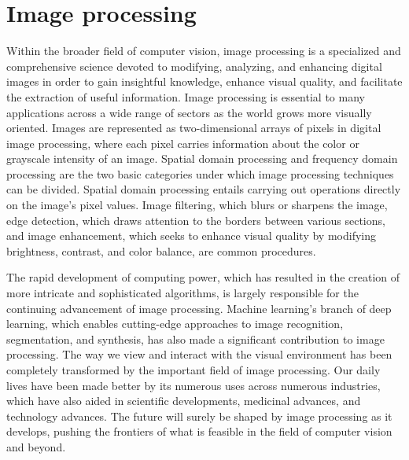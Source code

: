 \documentclass[a4paper,12pt]{report}%
\renewcommand{\\}{\vspace*{0.5\baselineskip} \newline}
\begin{document}
\section{Image processing}
Within the broader field of computer vision, image processing is a specialized and comprehensive science devoted to modifying, analyzing, and enhancing digital images in order to gain insightful knowledge, enhance visual quality, and facilitate the extraction of useful information. Image processing is essential to many applications across a wide range of sectors as the world grows more visually oriented.
Images are represented as two-dimensional arrays of pixels in digital image processing, where each pixel carries information about the color or grayscale intensity of an image. Spatial domain processing and frequency domain processing are the two basic categories under which image processing techniques can be divided. Spatial domain processing entails carrying out operations directly on the image's pixel values. Image filtering, which blurs or sharpens the image, edge detection, which draws attention to the borders between various sections, and image enhancement, which seeks to enhance visual quality by modifying brightness, contrast, and color balance, are common procedures.

\noindent The rapid development of computing power, which has resulted in the creation of more intricate and sophisticated algorithms, is largely responsible for the continuing advancement of image processing. Machine learning's branch of deep learning, which enables cutting-edge approaches to image recognition, segmentation, and synthesis, has also made a significant contribution to image processing.
The way we view and interact with the visual environment has been completely transformed by the important field of image processing. Our daily lives have been made better by its numerous uses across numerous industries, which have also aided in scientific developments, medicinal advances, and technology advances. The future will surely be shaped by image processing as it develops, pushing the frontiers of what is feasible in the field of computer vision and beyond. 
\end{document}
